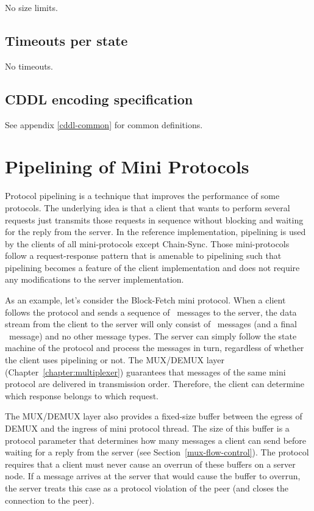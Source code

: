 No size limits.

\subsection{Timeouts per state}

No timeouts.

\subsection{CDDL encoding specification}

See appendix \ref{cddl-common} for common definitions.

\section{Pipelining of Mini Protocols}
\label{pipelining}
Protocol pipelining is a technique that improves the performance of some protocols.
The underlying idea is that a client that wants to perform several requests
just transmits those requests in sequence without blocking and waiting for the reply from the server.
In the reference implementation, pipelining is used by the clients of all mini-protocols except Chain-Sync.
Those mini-protocols follow a request-response pattern that is amenable to pipelining such
that pipelining becomes a feature of the client implementation and does not require any
modifications to the server implementation.

As an example, let's consider the Block-Fetch mini protocol.
When a client follows the protocol and sends a sequence of \MsgRequestRange{}~messages to the server, the data stream from the client to the server will only consist of \MsgRequestRange~messages
(and a final \MsgClientDone~message) and no other message types.
The server can simply follow the state machine of the protocol and process the messages in turn,
regardless of whether the client uses pipelining or not.
The MUX/DEMUX layer (Chapter~\ref{chapter:multiplexer}) guarantees
that messages of the same mini protocol are delivered in transmission order.
Therefore, the client can determine which response belongs to which request.

The MUX/DEMUX layer also provides a fixed-size buffer between the egress of DEMUX and the ingress
of mini protocol thread.
The size of this buffer is a protocol parameter that determines how many messages
a client can send before waiting for a reply from the server (see Section~\ref{mux-flow-control}).
The protocol requires that a client must never cause an overrun of these buffers on a server node.
If a message arrives at the server that would cause the buffer to overrun,
the server treats this case as a protocol violation of the peer
(and closes the connection to the peer).


